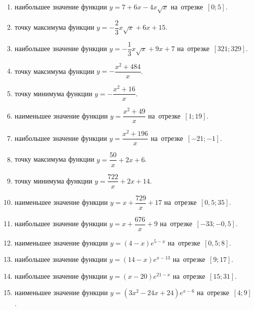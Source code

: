 \documentclass[a4paper,10pt]{article}
\begin{document}
\begin{enumerate}
\item {} наибольшее значение функции $y=7+6x -4x\sqrt{x}$ на~отрезке~$\left[0;5\right]$.

\item {} точку максимума функции $y=-\dfrac{2}{3}x\sqrt{x} +6x+15$.

\item {} наибольшее значение функции $y=-\dfrac{1}{3}x\sqrt{x} +9x+7$ на~отрезке~$\left[321;329\right]$.

\item {} точку максимума функции $y=-\dfrac{x^2 +484}{x}$.

\item {} точку минимума функции $y=-\dfrac{x^2 +16}{x}$.

\item {} наименьшее значение функции $y=\dfrac{x^2 +49}{x}$ на~отрезке~$\left[1;19\right]$.

\item {} наибольшее значение функции $y=\dfrac{x^2 +196}{x}$ на~отрезке~$\left[-21;-1\right]$.

\item {} точку максимума функции $y=\dfrac{50}{x} +2x+6$.

\item {} точку минимума функции $y=\dfrac{722}{x} +2x+14$.

\item {} наименьшее значение функции $y=x+\dfrac{729}{x} +17$ на~отрезке~$\left[0,5;35\right]$.

\item {} наибольшее значение функции $y=x+\dfrac{676}{x} +9$ на~отрезке~$\left[-33;-0,5\right]$.

\item {} наименьшее значение функции $y=\left(4-x\right)e^{5-x}$ на~отрезке~$\left[0,5;8\right]$.

\item {} наибольшее значение функции $y=\left(14-x\right)e^{x-13}$ на~отрезке~$\left[9;17\right]$.

\item {} наибольшее значение функции $y=\left(x-20\right)e^{21-x}$ на~отрезке~$\left[15;31\right]$.

\item {} наименьшее значение функции $y=\left(3x^2 -24x +24\right)e^{x -6}$ на~отрезке~$\left[4;9\right]$.


\end{enumerate}
\end{document}
